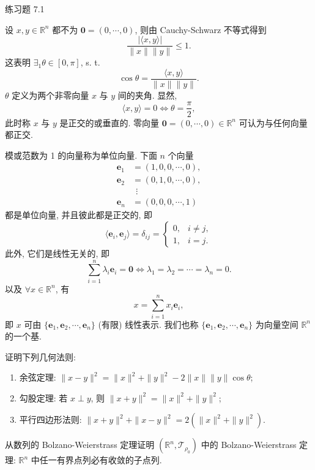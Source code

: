 \begin{exblock}{练习题 7.1}
\begin{enumerate}
\begin{enumerate}
    \end{enumerate}
  \end{enumerate}
  \item 设 $x, y \in \mathbb{R}^n$ 都不为 $\boldsymbol{0} = (0, \cdots, 0)$, 则由 Cauchy-Schwarz 不等式得到
  \[
    \frac{|\langle x, y \rangle|}{\|x\| \|y\|} \leqslant 1.
  \]
  这表明 $\exists_{1}\theta \in [0, \pi]$, s. t.
  \[
    \cos\theta = \frac{\langle x, y \rangle}{\|x\| \|y\|}.
  \]
  $\theta$ 定义为两个非零向量 $x$ 与 $y$ 间的夹角. 显然,
  \[
    \langle x, y \rangle = 0 \iff \theta = \frac{\pi}{2},
  \]
  此时称 $x$ 与 $y$ 是正交的或垂直的. 零向量 $\boldsymbol{0} = (0, \cdots, 0) \in \mathbb{R}^n$ 可认为与任何向量都正交.

  模或范数为 1 的向量称为单位向量. 下面 $n$ 个向量
  \[
    \begin{aligned}
      \boldsymbol{e}_{1} &= (1, 0, 0, \cdots, 0),\\
      \boldsymbol{e}_{2} &= (0, 1, 0, \cdots, 0),\\
      &\ \ \vdots\\
      \boldsymbol{e}_{n} &= (0, 0, 0, \cdots, 1)
    \end{aligned}
  \]
  都是单位向量, 并且彼此都是正交的, 即
  \[
    \langle \boldsymbol{e}_i, \boldsymbol{e}_j \rangle = \delta_{ij} = \begin{cases} 0, & i \neq j,\\ 1, & i = j. \end{cases}
  \]
  此外, 它们是线性无关的, 即
  \[
    \sum_{i=1}^{n} \lambda_i \boldsymbol{e}_i = \boldsymbol{0} \iff \lambda_1 = \lambda_2 = \cdots = \lambda_n = 0.
  \]
  以及 $\forall x \in \mathbb{R}^n$, 有
  \[
    x = \sum_{i=1}^{n} x_i \boldsymbol{e}_i,
  \]
  即 $x$ 可由 $\{\boldsymbol{e}_1, \boldsymbol{e}_2, \cdots, \boldsymbol{e}_n\}$ (有限) 线性表示. 我们也称 $\{\boldsymbol{e}_1, \boldsymbol{e}_2, \cdots, \boldsymbol{e}_n\}$ 为向量空间 $\mathbb{R}^n$ 的一个基.
  \item 证明下列几何法则:
  \begin{enumerate}
    \item 余弦定理: $\|x - y\|^2 = \|x\|^2 + \|y\|^2 - 2\|x\| \|y\| \cos\theta$;
    \item 勾股定理: 若 $x \perp y$, 则 $\|x + y\|^2 = \|x\|^2 + \|y\|^2$;
    \item 平行四边形法则: $\|x + y\|^2 + \|x - y\|^2 = 2(\|x\|^2 + \|y\|^2)$.
  \end{enumerate}
  \item 从数列的 Bolzano-Weierstrass 定理证明 $(\mathbb{R}^n, \mathcal{T}_{\rho_0})$ 中的 Bolzano-Weierstrass 定理: $\mathbb{R}^n$ 中任一有界点列必有收敛的子点列.

\end{exblock}
